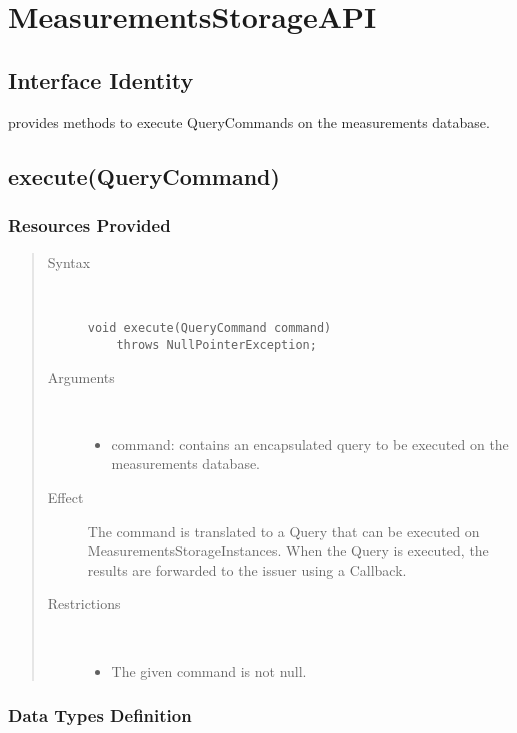 \section{MeasurementsStorageAPI}

\subsection{Interface Identity}

\npar {} provides methods to execute
QueryCommands on the measurements database.

\subsection{execute(QueryCommand)}

\subsubsection{Resources Provided}

\begin{quote}
	\begin{description}
		\item[Syntax] \ 
		\begin{verbatim}
void execute(QueryCommand command) 
    throws NullPointerException;
		\end{verbatim}
		\item[Arguments] \
		\begin{itemize}
			\item command: contains an encapsulated query to be executed on the
			measurements database.
		\end{itemize}
		\item[Effect] The command is translated to a Query that can be executed on
		MeasurementsStorageInstances. When the Query is executed, the results are
		forwarded to the issuer using a Callback.
		\item[Restrictions] \ 
		\begin{itemize}
			\item The given command is not null.
		\end{itemize}
	\end{description} 
\end{quote}

\subsubsection{Data Types Definition}

